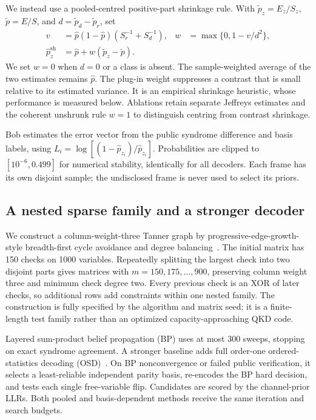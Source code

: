 We instead use a pooled-centred positive-part shrinkage rule. With
$\widetilde p_z=E_z/S_z$, $\widetilde p=E/S$, and
$d=\widetilde p_d-\widetilde p_r$, set
\begin{align}
 v&=\widehat p(1-\widehat p)(S_r^{-1}+S_d^{-1}), &
 w&=\max\{0,1-v/d^2\}, \label{eq:weight}\\
 \widehat p_z^{\mathrm{sh}}&=\widehat p+w(\widetilde p_z-\widetilde p).
 &&\label{eq:shrink}
\end{align}
We set $w=0$ when $d=0$ or a class is absent. The sample-weighted average of the two
estimates remains $\widehat p$. The plug-in weight suppresses a contrast that is small
relative to its estimated variance. It is an empirical shrinkage heuristic, whose performance
is measured below. Ablations retain separate Jeffreys estimates and the coherent unshrunk
rule $w=1$ to distinguish centring from contrast shrinkage.

Bob estimates the error vector from the public syndrome difference and basis labels, using
$L_i=\log[(1-\widehat p_{z_i})/\widehat p_{z_i}]$.
Probabilities are clipped to $[10^{-6},0.499]$ for numerical stability, identically for all
decoders. Each frame has its own disjoint sample; the undisclosed frame is never used to
select its priors.

\subsection{A nested sparse family and a stronger decoder}
We construct a column-weight-three Tanner graph by progressive-edge-growth-style
breadth-first cycle avoidance and degree balancing~\cite{hu2005}. The initial matrix has
150 checks on 1000 variables. Repeatedly splitting the largest check into two disjoint
parts gives matrices with $m=150,175,\ldots,900$, preserving column weight three and
minimum check degree two. Every previous check is an XOR of later checks, so additional
rows add constraints within one nested family. The construction is fully specified by the
algorithm and matrix seed; it is a finite-length test family rather than an optimized
capacity-approaching QKD code.

Layered sum-product belief propagation (BP) uses at most 300 sweeps, stopping on exact
syndrome agreement. A stronger baseline adds full order-one ordered-statistics decoding
(OSD)~\cite{fossorier1995}. On BP nonconvergence or failed public verification, it selects
a least-reliable independent parity basis, re-encodes the BP hard decision, and tests each
single free-variable flip. Candidates are scored by the channel-prior LLRs. Both pooled
and basis-dependent methods receive the same iteration and search budgets.

